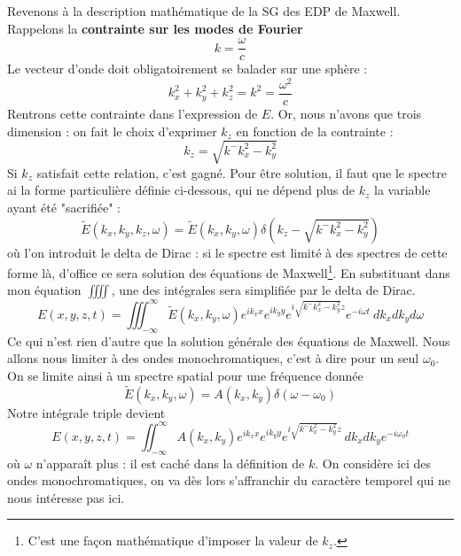 Revenons à la description mathématique de la SG des EDP de Maxwell. Rappelons la \textbf{contrainte 
sur les modes de Fourier} 
\begin{equation}
k = \dfrac{\omega}{c}
\end{equation}
Le vecteur d'onde doit obligatoirement se balader sur une sphère :
\begin{equation}
k_x^2+k_y^2+k_z^2 = k^2 = \dfrac{\omega^2}{c}
\end{equation}
Rentrons cette contrainte dans l'expression de $E$. Or, nous n'avons que trois dimension : on 
fait le choix d'exprimer $k_z$ en fonction de la contrainte :
\begin{equation}
k_z = \sqrt{k^-k_x^2-k_y^2}
\end{equation}
Si $k_z$ satisfait cette relation, c'est gagné. Pour être solution, il faut que le spectre ai 
la forme particulière définie ci-dessous, qui ne dépend plus de $k_z$ la variable ayant été 
"sacrifiée" :
\begin{equation}
\tilde{E}(k_x,k_y,k_z,\omega) = \tilde{E}(k_x,k_y,\omega)\delta\left(k_z-\sqrt{k^-k_x^2-k_y^2}\right)
\end{equation}
où l'on introduit le delta de Dirac : si le spectre est limité à des spectres de cette forme là, 
d'office ce sera solution des équations de Maxwell\footnote{C'est une façon mathématique d'imposer 
la valeur de $k_z$.}. En substituant dans mon équation $\iiiint$, une des intégrales sera simplifiée 
par le delta de Dirac.
\begin{equation}
E(x,y,z,t) = \iiint_{-\infty}^\infty \tilde{E}(k_x,k_y,\omega) e^{ik_xx}e^{ik_yy}e^{i 
\sqrt{k^-k_x^2-k_y^2} z}e^{-i\omega t}\ dk_xdk_yd\omega
\end{equation}
Ce qui n'est rien d'autre que la solution générale des équations de Maxwell. Nous allons nous limiter 
à des ondes monochromatiques, c'est à dire pour un seul $\omega_0$. On se limite ainsi à un spectre 
spatial pour une fréquence donnée
\begin{equation}
\tilde{E}(k_x,k_y,\omega) = A(k_x,k_y)\delta(\omega-\omega_0)
\end{equation}
Notre intégrale triple devient
\begin{equation}
E(x,y,z,t) = \iint_{-\infty}^\infty A(k_x,k_y) e^{ik_xx}e^{ik_yy}e^{i 
\sqrt{k^-k_x^2-k_y^2} z}\ dk_xdk_ye^{-i\omega_0 t}
\end{equation}
où $\omega$ n'apparaît plus : il est caché dans la définition de $k$. On considère ici des ondes 
monochromatiques, on va dès lors s'affranchir du caractère temporel qui ne nous intéresse pas ici. 
